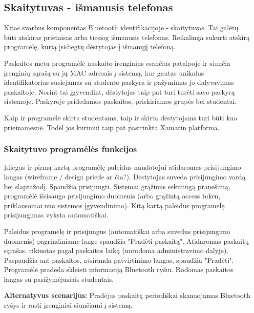 \documentclass{VUMIFPSkursinis}
\begin{document}
\subsection{Skaitytuvas - išmanusis telefonas}
Kitas svarbus komponentas Bluetooth identifikacijoje - skaitytuvas. Tai galėtų būti atskiras prietaisas arba tiesiog išmanusis telefonas. Reikalinga sukurti atskirą programėlę, kurią įsidiegtų dėstytojas į išmanųjį telefoną.

Paskaitos metu programėlė nuskaito įrenginius esančius patalpoje ir siunčia įrenginių sąrašą su jų MAC adresais į sistemą, kur gautas unikalus identifikatorius susiejamas su studento paskyra ir pažymimas jo dalyvavimas paskaitoje. Norint tai įgyvendint, dėstytojas taip pat turi turėti savo paskyrą sistemoje. Paskyroje pridedamos paskaitos, priskiriamos grupės bei studentai.

Kaip ir programėlė skirta studentams, taip ir skirta dėstytojams turi būti kuo prieinamesnė. Todėl jos kūrimui taip pat pasirinkta Xamarin platforma.

\subsubsection{Skaitytuvo programėlės funkcijos}


Įdiegus ir pirmą kartą programėlę paleidus naudotojui atidaromas prisijungimo langas (wireframe / design priede ar čia?). Dėstytojas suveda prisijungimo vardą bei slaptažodį. Spaudžia prisijungti. Sistemai grąžinus sėkmingą pranešimą, programėlė išsisaugo prisijungimo duomenis (arba grąžintą access token, priklausomai nuo sistemos įgyvendinimo). Kitą kartą paleidus programėlę prisijungimas vyksta automatiškai.


Paleidus programėlę ir prisijungus (automatiškai arba suvedus prisijungimo duomenis) pagrindiniame lange spaudžia "Pradėti paskaitą". Atidaromas paskaitų sąrašas, rikiuotas pagal paskaitos laiką (nurodoma administravimo dalyje). Paspaudžia ant paskaitos, atsiranda patvirtinimo langas, spaudžia "Pradėti". Programėlė pradeda skleisti informaciją Bluetooth ryšiu. Rodomas paskaitos langas su pasižymėjusiais studentais.

\textbf{Alternatyvus scenarijus:} Pradėjus paskaitą periodiškai skanuojamas Bluetooth ryšys ir rasti įrenginiai siunčiami į sistemą.

\end{document}
